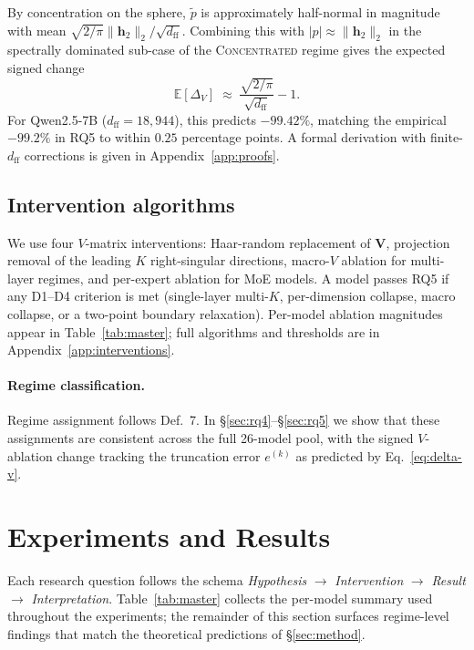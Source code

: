 \documentclass{article}
\newcommand{\ffd}{d_{\text{ff}}}
\begin{document}
By concentration on the sphere, $\tilde{p}$ is approximately half-normal in
magnitude with mean $\sqrt{2/\pi}\|\mathbf{h}_2\|_2/\sqrt{\ffd}$. Combining
this with $|p| \approx \|\mathbf{h}_2\|_2$ in the spectrally dominated
sub-case of the \textsc{Concentrated} regime gives the expected signed change
\begin{equation}
  \label{eq:delta-v}
  \mathbb{E}[\Delta_V] \;\approx\; \frac{\sqrt{2/\pi}}{\sqrt{\ffd}} - 1.
\end{equation}
For Qwen2.5-7B ($\ffd = 18{,}944$), this predicts $-99.42\%$, matching the
empirical $-99.2\%$ in RQ5 to within $0.25$ percentage points. A formal
derivation with finite-$\ffd$ corrections is given in
Appendix~\ref{app:proofs}.

\subsection{Intervention algorithms}
\label{sec:method-interventions}

We use four $V$-matrix interventions: Haar-random replacement of
$\mathbf{V}$, projection removal of the leading $K$ right-singular
directions, macro-$V$ ablation for multi-layer regimes, and per-expert
ablation for MoE models. A model passes RQ5 if any D1--D4 criterion is met
(single-layer multi-$K$, per-dimension collapse, macro collapse, or a
two-point boundary relaxation). Per-model ablation magnitudes appear in
Table~\ref{tab:master}; full algorithms and thresholds are in
Appendix~\ref{app:interventions}.

\paragraph{Regime classification.}
Regime assignment follows Def.~7. In \S\ref{sec:rq4}--\S\ref{sec:rq5} we
show that these assignments are consistent across the full 26-model pool,
with the signed $V$-ablation change tracking the truncation error $e^{(k)}$ as
predicted by Eq.~\eqref{eq:delta-v}.

\section{Experiments and Results}
\label{sec:exp}

Each research question follows the schema \emph{Hypothesis} $\rightarrow$
\emph{Intervention} $\rightarrow$ \emph{Result} $\rightarrow$
\emph{Interpretation}. Table~\ref{tab:master} collects the per-model
summary used throughout the experiments; the remainder of this section
surfaces regime-level findings that match the theoretical predictions of
\S\ref{sec:method}.
\end{document}

